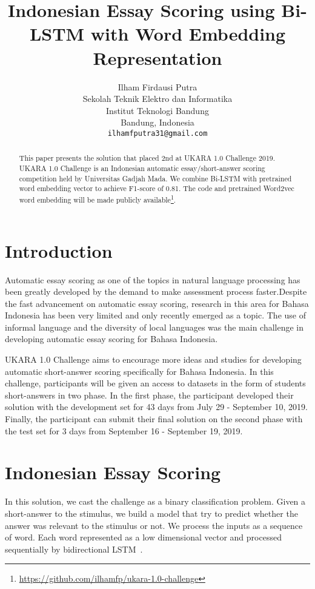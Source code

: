 \documentclass[11pt,a4paper]{article}
\title{Indonesian Essay Scoring using Bi-LSTM with Word Embedding Representation}
\author{Ilham Firdausi Putra \\
  Sekolah Teknik Elektro dan Informatika \\
  Institut Teknologi Bandung \\
  Bandung, Indonesia \\
  \texttt{ilhamfputra31@gmail.com} \\}
\date{}
\begin{document}
\maketitle
\begin{abstract}
  This paper presents the solution that placed 2nd at UKARA 1.0 Challenge 2019. UKARA 1.0 Challenge is an Indonesian automatic essay/short-answer scoring competition held by Universitas Gadjah Mada. We combine Bi-LSTM with pretrained word embedding vector to achieve F1-score of 0.81. The code and pretrained Word2vec word embedding will be made publicly available\footnote{\url{https://github.com/ilhamfp/ukara-1.0-challenge}}.
\end{abstract}

\section{Introduction}

Automatic essay scoring as one of the topics in natural language processing has been greatly developed by the demand to make assessment process faster.Despite the fast advancement on automatic essay scoring, research in this area for Bahasa Indonesia has been very limited and only recently emerged as a topic. The use of informal language and the diversity of local languages was the main challenge in developing automatic essay scoring for Bahasa Indonesia.

UKARA 1.0 Challenge aims to encourage more ideas and studies for developing automatic short-answer scoring specifically for Bahasa Indonesia. In this challenge, participants will be given an access to datasets in the form of students short-answers in two phase. In the first phase, the participant developed their solution with the development set for 43 days from July 29 - September 10, 2019. Finally, the participant can submit their final solution on the second phase with the test set for 3 days from September 16 - September 19, 2019.

\section{Indonesian Essay Scoring}

In this solution, we cast the challenge as a binary classification problem. Given a short-answer to the stimulus, we build a model that try to predict whether the answer was relevant to the stimulus or not. We process the inputs as a sequence of word. Each word represented as a low dimensional vector and processed sequentially by bidirectional LSTM~\cite{LSTM}.
\end{document}
